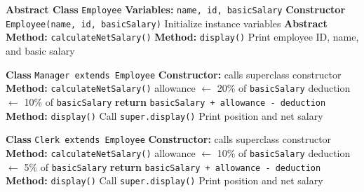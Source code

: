 
\begin{algorithm}[H]
\caption{Employee Salary Calculation Using Abstract Class}
\begin{algorithmic}[1]

\STATE \textbf{Abstract Class} \texttt{Employee}
\STATE \hspace{1em} \textbf{Variables:} \texttt{name, id, basicSalary}
\STATE \hspace{1em} \textbf{Constructor} \texttt{Employee(name, id, basicSalary)}
\STATE \hspace{2em} Initialize instance variables
\STATE \hspace{1em} \textbf{Abstract Method:} \texttt{calculateNetSalary()}
\STATE \hspace{1em} \textbf{Method:} \texttt{display()}
\STATE \hspace{2em} Print employee ID, name, and basic salary

\STATE

\STATE \textbf{Class} \texttt{Manager extends Employee}
\STATE \hspace{1em} \textbf{Constructor:} calls superclass constructor
\STATE \hspace{1em} \textbf{Method:} \texttt{calculateNetSalary()}
\STATE \hspace{2em} allowance $\gets$ 20\% of \texttt{basicSalary}
\STATE \hspace{2em} deduction $\gets$ 10\% of \texttt{basicSalary}
\STATE \hspace{2em} \textbf{return} \texttt{basicSalary + allowance - deduction}
\STATE \hspace{1em} \textbf{Method:} \texttt{display()}
\STATE \hspace{2em} Call \texttt{super.display()}
\STATE \hspace{2em} Print position and net salary

\STATE

\STATE \textbf{Class} \texttt{Clerk extends Employee}
\STATE \hspace{1em} \textbf{Constructor:} calls superclass constructor
\STATE \hspace{1em} \textbf{Method:} \texttt{calculateNetSalary()}
\STATE \hspace{2em} allowance $\gets$ 10\% of \texttt{basicSalary}
\STATE \hspace{2em} deduction $\gets$ 5\% of \texttt{basicSalary}
\STATE \hspace{2em} \textbf{return} \texttt{basicSalary + allowance - deduction}
\STATE \hspace{1em} \textbf{Method:} \texttt{display()}
\STATE \hspace{2em} Call \texttt{super.display()}
\STATE \hspace{2em} Print position and net salary


\end{algorithmic}
\end{algorithm}
